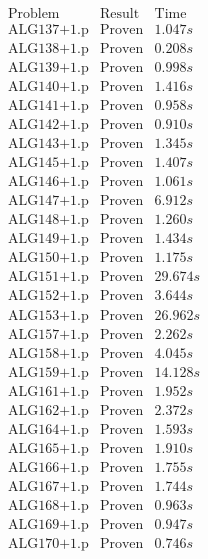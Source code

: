 \documentclass[a4paper,11pt]{report}
\theoremstyle{definition}
\theoremstyle{definition}
\theoremstyle{definition}
\theoremstyle{definition}
\theoremstyle{definition}
\theoremstyle{definition}
\theoremstyle{definition}
\begin{document}
	\begin{minipage}{0.45\textwidth}
		\[\begin{matrix}
			\text{Problem}&\text{Result}&\text{Time}\\
			\text{ALG137+1.p}&\text{Proven}& 1.047 s\\
			\text{ALG138+1.p}&\text{Proven}& 0.208 s\\
			\text{ALG139+1.p}&\text{Proven}& 0.998 s\\
			\text{ALG140+1.p}&\text{Proven}& 1.416 s\\
			\text{ALG141+1.p}&\text{Proven}& 0.958 s\\
			\text{ALG142+1.p}&\text{Proven}& 0.910 s\\
			\text{ALG143+1.p}&\text{Proven}& 1.345 s\\
			\text{ALG145+1.p}&\text{Proven}& 1.407 s\\
			\text{ALG146+1.p}&\text{Proven}& 1.061 s\\
			\text{ALG147+1.p}&\text{Proven}& 6.912 s\\
			\text{ALG148+1.p}&\text{Proven}& 1.260 s\\
			\text{ALG149+1.p}&\text{Proven}& 1.434 s\\
			\text{ALG150+1.p}&\text{Proven}& 1.175 s\\
			\text{ALG151+1.p}&\text{Proven}& 29.674 s\\
			\text{ALG152+1.p}&\text{Proven}& 3.644 s\\
			\text{ALG153+1.p}&\text{Proven}& 26.962 s\\
			\text{ALG157+1.p}&\text{Proven}& 2.262 s\\
			\text{ALG158+1.p}&\text{Proven}& 4.045 s\\
			\text{ALG159+1.p}&\text{Proven}& 14.128 s\\
			\text{ALG161+1.p}&\text{Proven}& 1.952 s\\
			\text{ALG162+1.p}&\text{Proven}& 2.372 s\\
			\text{ALG164+1.p}&\text{Proven}& 1.593 s\\
			\text{ALG165+1.p}&\text{Proven}& 1.910 s\\
			\text{ALG166+1.p}&\text{Proven}& 1.755 s\\
			\text{ALG167+1.p}&\text{Proven}& 1.744 s\\
			\text{ALG168+1.p}&\text{Proven}& 0.963 s\\
			\text{ALG169+1.p}&\text{Proven}& 0.947 s\\
			\text{ALG170+1.p}&\text{Proven}& 0.746 s\\

\end{matrix}\]
\end{minipage}
\end{document}
